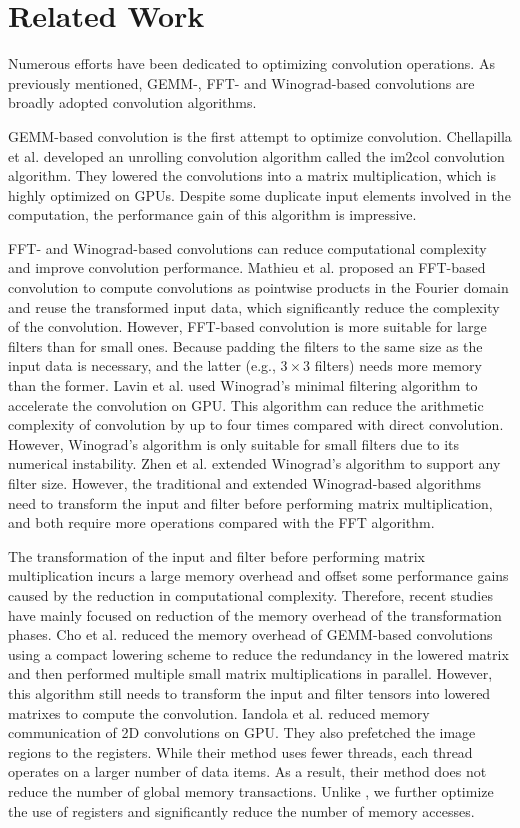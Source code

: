 \section{Related Work}
Numerous efforts have been dedicated to optimizing convolution operations. As previously mentioned, GEMM-, FFT- and
Winograd-based convolutions are broadly adopted convolution algorithms.

GEMM-based convolution is the first attempt to optimize convolution. Chellapilla et al. \cite{Chellapilla2006High} developed an unrolling
convolution algorithm  called the im2col convolution algorithm. They lowered the convolutions into a matrix multiplication, which is
highly optimized on GPUs. Despite some duplicate input elements involved in the computation, the performance gain of this algorithm is impressive.

FFT- and Winograd-based convolutions can reduce computational complexity and improve convolution performance. Mathieu et al.
\cite{mathieu2013fast} proposed an FFT-based convolution to compute convolutions as pointwise products in the Fourier domain and reuse the
transformed input data, which significantly reduce the complexity of the convolution. However, FFT-based convolution is more suitable for large filters than
for small ones. Because padding the filters to the same size as the input data is necessary, and  the latter (e.g., $3 \times 3$ filters) needs
more memory than the former. Lavin et al. \cite{lavin2016fast} used Winograd's minimal filtering algorithm to
accelerate the convolution on GPU. This algorithm can reduce the arithmetic complexity of convolution by up to four times compared with
direct convolution. However, Winograd's algorithm is only suitable for small filters due to its numerical instability.
Zhen et al. \cite{Zhen2018Optimizing} extended Winograd's algorithm to support any filter size. However, the traditional and extended Winograd-based
algorithms need to transform the input and filter before performing matrix multiplication, and both require more operations compared with
the FFT algorithm.

The transformation of the input and filter before performing matrix multiplication incurs a large memory overhead and offset some
performance gains caused by the reduction in computational complexity. Therefore, recent studies have mainly focused on reduction of
the memory overhead of the transformation phases. Cho et al. \cite{cho2017mec} reduced the memory overhead of GEMM-based convolutions using
a compact lowering scheme to reduce the redundancy in the lowered matrix and then performed multiple small matrix multiplications in
parallel. However, this algorithm still needs to transform the input and filter tensors into lowered matrixes to compute the convolution.
Iandola et al. \cite{Iandola2014Communication} reduced memory communication of 2D convolutions on GPU. They also prefetched the image
regions to the registers. While their method uses fewer threads, each thread operates on a larger number of data items. As a result, their
method does not reduce the number of global memory transactions. Unlike \cite{Iandola2014Communication}, we further optimize the use of
registers and significantly reduce the number of memory accesses.
